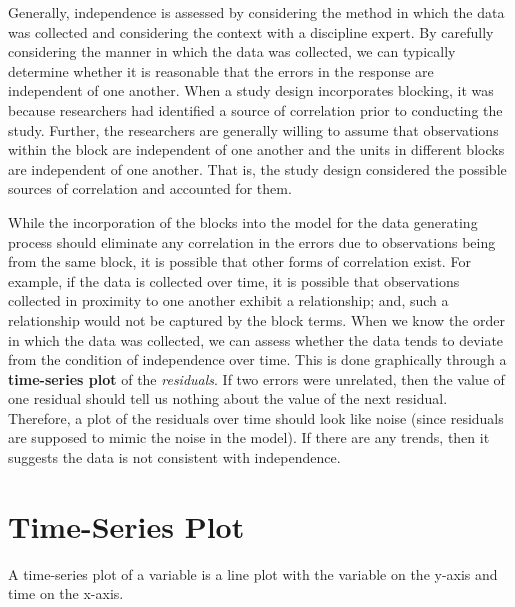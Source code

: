 \documentclass[
  letterpaper,
  DIV=11,
  numbers=noendperiod]{scrreprt}
\theoremstyle{definition}
\theoremstyle{definition}
\theoremstyle{plain}
\theoremstyle{remark}
\begin{document}
Generally, independence is assessed by considering the method in which
the data was collected and considering the context with a discipline
expert. By carefully considering the manner in which the data was
collected, we can typically determine whether it is reasonable that the
errors in the response are independent of one another. When a study
design incorporates blocking, it was because researchers had identified
a source of correlation prior to conducting the study. Further, the
researchers are generally willing to assume that observations within the
block are independent of one another and the units in different blocks
are independent of one another. That is, the study design considered the
possible sources of correlation and accounted for them.

While the incorporation of the blocks into the model for the data
generating process should eliminate any correlation in the errors due to
observations being from the same block, it is possible that other forms
of correlation exist. For example, if the data is collected over time,
it is possible that observations collected in proximity to one another
exhibit a relationship; and, such a relationship would not be captured
by the block terms. When we know the order in which the data was
collected, we can assess whether the data tends to deviate from the
condition of independence over time. This is done graphically through a
\textbf{time-series plot} of the \emph{residuals}. If two errors were
unrelated, then the value of one residual should tell us nothing about
the value of the next residual. Therefore, a plot of the residuals over
time should look like noise (since residuals are supposed to mimic the
noise in the model). If there are any trends, then it suggests the data
is not consistent with independence.

\section{Time-Series Plot}\label{time-series-plot-2}

A time-series plot of a variable is a line plot with the variable on the
y-axis and time on the x-axis.
\end{document}

